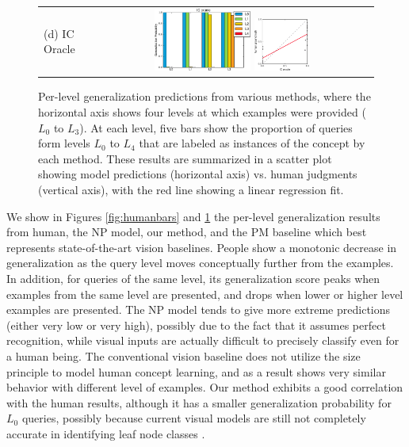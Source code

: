 \begin{figure}
\begin{tabular}{lc}
        (d) IC Oracle & \includegraphics[width=0.35\textwidth]{figs/vcl/per_level_response_ic.pdf}
        \includegraphics[width=0.2\textwidth]{figs/vcl/correlation_ic.pdf}\\
    \end{tabular}
\caption{Per-level generalization predictions from various methods, where the horizontal axis shows four levels at which examples were provided ($L_0$ to $L_3$). At each level, five bars show the proportion of queries form levels $L_0$ to $L_4$ that are labeled as instances of the concept by each method. These results are summarized in a scatter plot showing model predictions (horizontal axis) vs. human judgments (vertical axis), with the red line showing a linear regression fit.}\label{fig:bars}
\end{figure}


We show in Figures \ref{fig:humanbars} and \ref{fig:bars} the per-level generalization results from human, the NP model, our method, and the PM baseline which best represents state-of-the-art vision baselines. People show a monotonic decrease in generalization as the query level moves conceptually further from the examples. In addition, for queries of the same level, its generalization score peaks when examples from the same level are presented, and drops when lower or higher level examples are presented. The NP model tends to give more extreme predictions (either very low or very high), possibly due to the fact that it assumes perfect recognition, while visual inputs are actually difficult to precisely classify even for a human being. The conventional vision baseline does not utilize the size principle to model human concept learning, and as a result shows very similar behavior with different level of examples. Our method exhibits a good correlation with the human results, although it has a smaller generalization probability for $L_0$ queries, possibly because current visual models are still not completely accurate in identifying leaf node classes \cite{deng2012hedging}.

